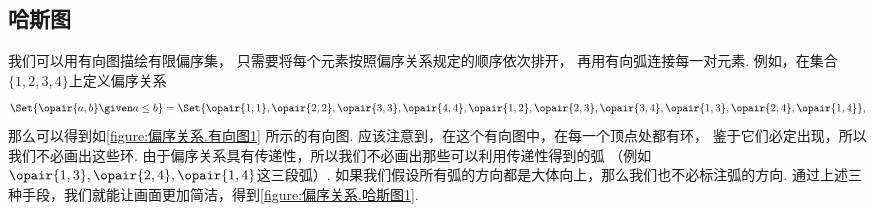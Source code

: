 \subsection{哈斯图}
我们可以用有向图描绘有限偏序集，
只需要将每个元素按照偏序关系规定的顺序依次排开，
再用有向弧连接每一对元素.
例如，在集合\(\{1,2,3,4\}\)上定义偏序关系\begin{equation*}
	\Set{\opair{a,b} \given a \leq b}
	= \Set{
		\opair{1,1},
		\opair{2,2},
		\opair{3,3},
		\opair{4,4},
		\opair{1,2},
		\opair{2,3},
		\opair{3,4},
		\opair{1,3},
		\opair{2,4},
		\opair{1,4}
	},
\end{equation*}
那么可以得到如\cref{figure:偏序关系.有向图1} 所示的有向图.
应该注意到，在这个有向图中，在每一个顶点处都有环，
鉴于它们必定出现，所以我们不必画出这些环.
由于偏序关系具有传递性，所以我们不必画出那些可以利用传递性得到的弧
（例如\(\opair{1,3},
\opair{2,4},
\opair{1,4}\)这三段弧）.
如果我们假设所有弧的方向都是大体向上，那么我们也不必标注弧的方向.
通过上述三种手段，我们就能让画面更加简洁，得到\cref{figure:偏序关系.哈斯图1}.

